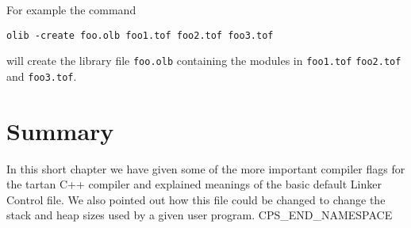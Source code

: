 For example the command
\begin{verbatim}
olib -create foo.olb foo1.tof foo2.tof foo3.tof
\end{verbatim}
will create the library file {\tt foo.olb} containing the modules
in {\tt foo1.tof} {\tt foo2.tof} and {\tt foo3.tof}.

\section{Summary}
In this short chapter we have given some of the more important compiler
flags for the tartan C++ compiler and explained meanings of the basic 
default Linker Control file. We also pointed out how this file could
be changed to change the stack and heap sizes used by a given user program.
CPS_END_NAMESPACE
